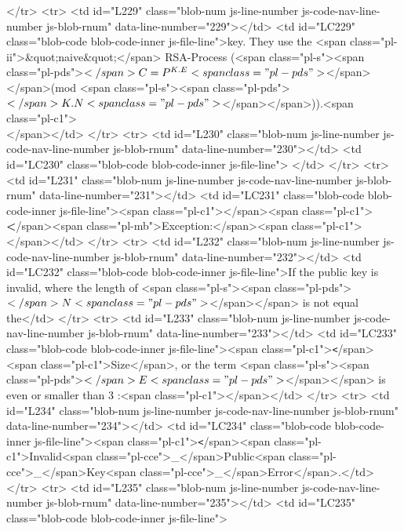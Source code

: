         </tr>
        <tr>
          <td id="L229" class="blob-num js-line-number js-code-nav-line-number js-blob-rnum" data-line-number="229"></td>
          <td id="LC229" class="blob-code blob-code-inner js-file-line">key. They use the <span class="pl-ii">&quot;naive&quot;</span> RSA-Process (<span class="pl-s"><span class="pl-pds">$</span>C=P^{K.E}<span class="pl-pds">$</span></span>(mod <span class="pl-s"><span class="pl-pds">$</span>K.N<span class="pl-pds">$</span></span>)).<span class="pl-c1">\\</span></td>
        </tr>
        <tr>
          <td id="L230" class="blob-num js-line-number js-code-nav-line-number js-blob-rnum" data-line-number="230"></td>
          <td id="LC230" class="blob-code blob-code-inner js-file-line">
</td>
        </tr>
        <tr>
          <td id="L231" class="blob-num js-line-number js-code-nav-line-number js-blob-rnum" data-line-number="231"></td>
          <td id="LC231" class="blob-code blob-code-inner js-file-line"><span class="pl-c1">\noindent</span><span class="pl-c1">\textbf</span>{<span class="pl-mb">Exception:</span>}<span class="pl-c1">\\</span></td>
        </tr>
        <tr>
          <td id="L232" class="blob-num js-line-number js-code-nav-line-number js-blob-rnum" data-line-number="232"></td>
          <td id="LC232" class="blob-code blob-code-inner js-file-line">If the public key is invalid, where the length of <span class="pl-s"><span class="pl-pds">$</span>N<span class="pl-pds">$</span></span> is not equal the</td>
        </tr>
        <tr>
          <td id="L233" class="blob-num js-line-number js-code-nav-line-number js-blob-rnum" data-line-number="233"></td>
          <td id="LC233" class="blob-code blob-code-inner js-file-line"><span class="pl-c1">\texttt</span>{<span class="pl-c1">Size</span>}, or the term <span class="pl-s"><span class="pl-pds">$</span>E<span class="pl-pds">$</span></span> is even or smaller than 3 :<span class="pl-c1">\quad</span></td>
        </tr>
        <tr>
          <td id="L234" class="blob-num js-line-number js-code-nav-line-number js-blob-rnum" data-line-number="234"></td>
          <td id="LC234" class="blob-code blob-code-inner js-file-line"><span class="pl-c1">\texttt</span>{<span class="pl-c1">Invalid<span class="pl-cce">\_</span>Public<span class="pl-cce">\_</span>Key<span class="pl-cce">\_</span>Error</span>}.</td>
        </tr>
        <tr>
          <td id="L235" class="blob-num js-line-number js-code-nav-line-number js-blob-rnum" data-line-number="235"></td>
          <td id="LC235" class="blob-code blob-code-inner js-file-line">
